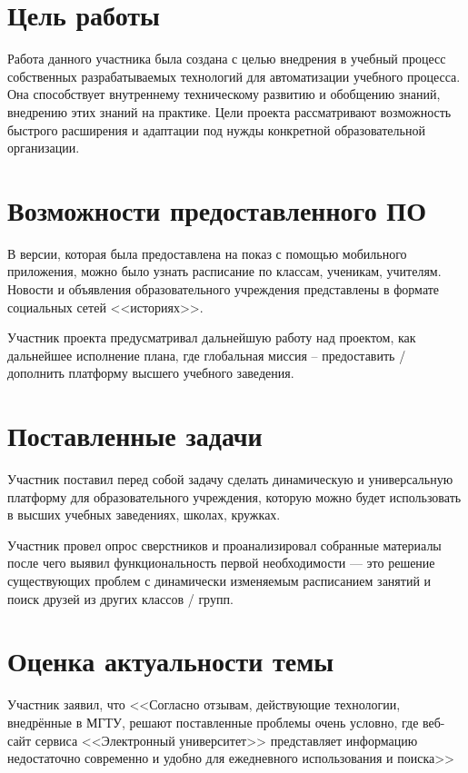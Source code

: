 \documentclass[12pt]{report}
\begin{document}
\section{Цель работы}

Работа данного участника была создана с целью внедрения в учебный процесс
собственных разрабатываемых технологий для автоматизации учебного процесса.
Она способствует внутреннему техническому развитию и обобщению знаний, внедрению этих знаний на практике.
Цели проекта рассматривают возможность быстрого расширения и адаптации под нужды
конкретной образовательной организации.

\section{Возможности предоставленного ПО}

В версии, которая была предоставлена на показ с помощью мобильного приложения, можно было
узнать расписание по классам, ученикам, учителям.
Новости и объявления образовательного учреждения представлены в 
формате социальных сетей <<историях>>.

Участник проекта предусматривал дальнейшую работу над проектом,
как дальнейшее исполнение плана, где глобальная миссия -- предоставить / дополнить платформу
высшего учебного заведения.

\section{Поставленные задачи}

Участник поставил перед собой задачу сделать динамическую и универсальную
платформу для образовательного учреждения, которую можно будет использовать
в высших учебных заведениях, школах, кружках. 

Участник провел опрос сверстников и проанализировал собранные материалы после чего 
выявил функциональность первой необходимости — это решение существующих
проблем с динамически изменяемым расписанием занятий и поиск друзей из других классов / групп.

\section{Оценка актуальности темы}

Участник заявил, что <<Согласно отзывам, действующие технологии, внедрённые в МГТУ, 
решают поставленные проблемы очень условно, где веб-сайт сервиса <<Электронный университет>>
представляет информацию недостаточно современно и удобно для ежедневного использования и поиска>>
\end{document}
